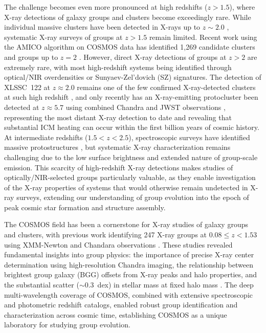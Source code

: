 \documentclass{aa}
\begin{document}
The challenge becomes even more pronounced at high redshifts ($z > 1.5$), where X-ray detections of galaxy groups and clusters become exceedingly rare. While individual massive clusters have been detected in X-rays up to $z \sim 2.0$ \citep{Willis2020}, systematic X-ray surveys of groups at $z > 1.5$ remain limited. Recent work using the AMICO algorithm on COSMOS data has identified 1,269 candidate clusters and groups up to $z = 2$ \citep{Toni2024}. However, direct X-ray detections of groups at $z > 2$ are extremely rare, with most high-redshift systems being identified through optical/NIR overdensities or Sunyaev-Zel'dovich (SZ) signatures. The detection of XLSSC~122 at $z \approx 2.0$ remains one of the few confirmed X-ray-detected clusters at such high redshift \citep{Willis2020}, and only recently has an X-ray-emitting protocluster been detected at $z \approx 5.7$ using combined Chandra and JWST observations \citep{Wang2025}, representing the most distant X-ray detection to date and revealing that substantial ICM heating can occur within the first billion years of cosmic history. At intermediate redshifts ($1.5 < z < 2.5$), spectroscopic surveys have identified massive protostructures \citep{Cucciati2024}, but systematic X-ray characterization remains challenging due to the low surface brightness and extended nature of group-scale emission. This scarcity of high-redshift X-ray detections makes studies of optically/NIR-selected groups particularly valuable, as they enable investigation of the X-ray properties of systems that would otherwise remain undetected in X-ray surveys, extending our understanding of group evolution into the epoch of peak cosmic star formation and structure assembly.

The COSMOS field has been a cornerstone for X-ray studies of galaxy groups and clusters, with previous work identifying 247 X-ray groups at $0.08 \leq z < 1.53$ using XMM-Newton and Chandara observations \citep{Finoguenov2007,George2011,Gozaliasl2019}. These studies revealed fundamental insights into group physics: the importance of precise X-ray center determination using high-resolution Chandra imaging, the relationship between brightest group galaxy (BGG) offsets from X-ray peaks and halo properties, and the substantial scatter ($\sim$0.3~dex) in stellar mass at fixed halo mass \citep{Gozaliasl2016,Gozaliasl2019}. The deep multi-wavelength coverage of COSMOS, combined with extensive spectroscopic and photometric redshift catalogs, enabled robust group identification and characterization across cosmic time, establishing COSMOS as a unique laboratory for studying group evolution.
\end{document}
